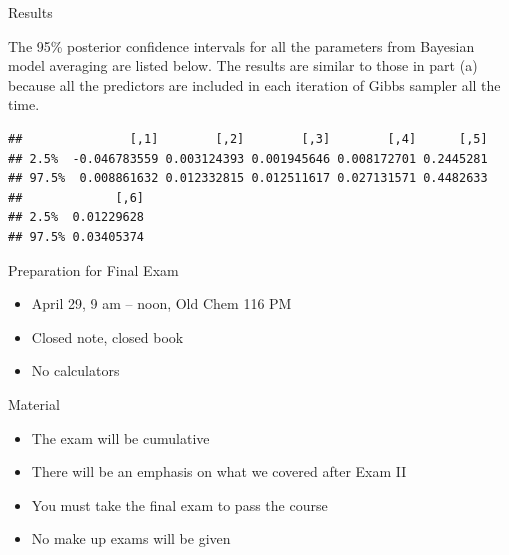 \documentclass[ignorenonframetext,]{beamer}
\newenvironment{Shaded}{\begin{snugshade}}{\end{snugshade}}
\newcommand{\KeywordTok}[1]{\textcolor[rgb]{0.13,0.29,0.53}{\textbf{#1}}}
\newcommand{\DataTypeTok}[1]{\textcolor[rgb]{0.13,0.29,0.53}{#1}}
\newcommand{\DecValTok}[1]{\textcolor[rgb]{0.00,0.00,0.81}{#1}}
\newcommand{\FloatTok}[1]{\textcolor[rgb]{0.00,0.00,0.81}{#1}}
\newcommand{\StringTok}[1]{\textcolor[rgb]{0.31,0.60,0.02}{#1}}
\newcommand{\CommentTok}[1]{\textcolor[rgb]{0.56,0.35,0.01}{\textit{#1}}}
\newcommand{\NormalTok}[1]{#1}
\providecommand{\tightlist}{%
  \setlength{\itemsep}{0pt}\setlength{\parskip}{0pt}}
\begin{document}
\begin{frame}[fragile]{Results}

The 95\% posterior confidence intervals for all the parameters from
Bayesian model averaging are listed below. The results are similar to
those in part (a) because all the predictors are included in each
iteration of Gibbs sampler all the time.

\footnotesize

\begin{Shaded}
\end{Shaded}

\begin{verbatim}
##               [,1]        [,2]        [,3]        [,4]      [,5]
## 2.5%  -0.046783559 0.003124393 0.001945646 0.008172701 0.2445281
## 97.5%  0.008861632 0.012332815 0.012511617 0.027131571 0.4482633
##             [,6]
## 2.5%  0.01229628
## 97.5% 0.03405374
\end{verbatim}

\end{frame}

\begin{frame}{Preparation for Final Exam}

\begin{itemize}
\tightlist
\item
  April 29, 9 am -- noon, Old Chem 116 PM
\item
  Closed note, closed book
\item
  No calculators
\end{itemize}

\end{frame}

\begin{frame}{Material}

\begin{itemize}
\tightlist
\item
  The exam will be cumulative
\item
  There will be an emphasis on what we covered after Exam II
\item
  You must take the final exam to pass the course
\item
  No make up exams will be given
\end{itemize}

\end{frame}
\end{document}
